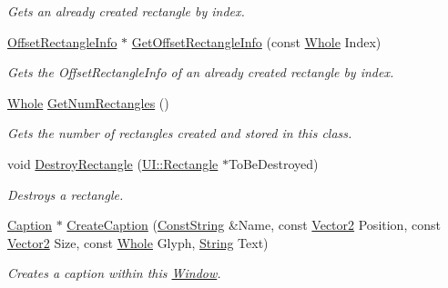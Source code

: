 \begin{DoxyCompactItemize}
\begin{DoxyCompactList}\small\item\em Gets an already created rectangle by index. \item\end{DoxyCompactList}\item 
\hyperlink{structphys_1_1UI_1_1ResizingInfo}{OffsetRectangleInfo} $\ast$ \hyperlink{classphys_1_1UI_1_1Window_aa39dd6dba9202cc9c0e8bd52efd53cba}{GetOffsetRectangleInfo} (const \hyperlink{namespacephys_a460f6bc24c8dd347b05e0366ae34f34a}{Whole} Index)
\begin{DoxyCompactList}\small\item\em Gets the OffsetRectangleInfo of an already created rectangle by index. \item\end{DoxyCompactList}\item 
\hyperlink{namespacephys_a460f6bc24c8dd347b05e0366ae34f34a}{Whole} \hyperlink{classphys_1_1UI_1_1Window_a4d2d8821df32a920e7389b37f50f7c6d}{GetNumRectangles} ()
\begin{DoxyCompactList}\small\item\em Gets the number of rectangles created and stored in this class. \item\end{DoxyCompactList}\item 
void \hyperlink{classphys_1_1UI_1_1Window_ab66c4c1d5f26e3f4fcdd34063b711365}{DestroyRectangle} (\hyperlink{classphys_1_1UI_1_1Rectangle}{UI::Rectangle} $\ast$ToBeDestroyed)
\begin{DoxyCompactList}\small\item\em Destroys a rectangle. \item\end{DoxyCompactList}\item 
\hyperlink{classphys_1_1UI_1_1Caption}{Caption} $\ast$ \hyperlink{classphys_1_1UI_1_1Window_a4d4c97599313e188805c8697d4fbb13f}{CreateCaption} (\hyperlink{namespacephys_a5ce5049f8b4bf88d6413c47b504ebb31}{ConstString} \&Name, const \hyperlink{classphys_1_1Vector2}{Vector2} Position, const \hyperlink{classphys_1_1Vector2}{Vector2} Size, const \hyperlink{namespacephys_a460f6bc24c8dd347b05e0366ae34f34a}{Whole} Glyph, \hyperlink{namespacephys_aa03900411993de7fbfec4789bc1d392e}{String} Text)
\begin{DoxyCompactList}\small\item\em Creates a caption within this \hyperlink{classphys_1_1UI_1_1Window}{Window}. \item\end{DoxyCompactList}\item 

\end{DoxyCompactItemize}
